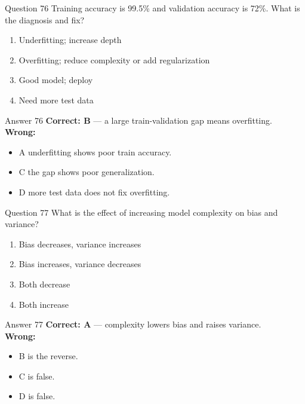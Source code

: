\documentclass[aspectratio=169,11pt]{beamer}
\begin{document}
	\begin{frame}{Question 76}
		Training accuracy is 99.5\% and validation accuracy is 72\%. What is the diagnosis and fix?
		\begin{enumerate}[label=\Alph*.]
			\item Underfitting; increase depth
			\item Overfitting; reduce complexity or add regularization
			\item Good model; deploy
			\item Need more test data
		\end{enumerate}
	\end{frame}
	\begin{frame}{Answer 76}
		\textbf{Correct: B} --- a large train-validation gap means overfitting.\\
		\vspace{0.5em}
		\textbf{Wrong:}
		\begin{itemize}
			\item A underfitting shows poor train accuracy.
			\item C the gap shows poor generalization.
			\item D more test data does not fix overfitting.
		\end{itemize}
	\end{frame}
	
	\begin{frame}{Question 77}
		What is the effect of increasing model complexity on bias and variance?
		\begin{enumerate}[label=\Alph*.]
			\item Bias decreases, variance increases
			\item Bias increases, variance decreases
			\item Both decrease
			\item Both increase
		\end{enumerate}
	\end{frame}
	\begin{frame}{Answer 77}
		\textbf{Correct: A} --- complexity lowers bias and raises variance.\\
		\vspace{0.5em}
		\textbf{Wrong:}
		\begin{itemize}
			\item B is the reverse.
			\item C is false.
			\item D is false.
		\end{itemize}
	\end{frame}
	
\end{document}
